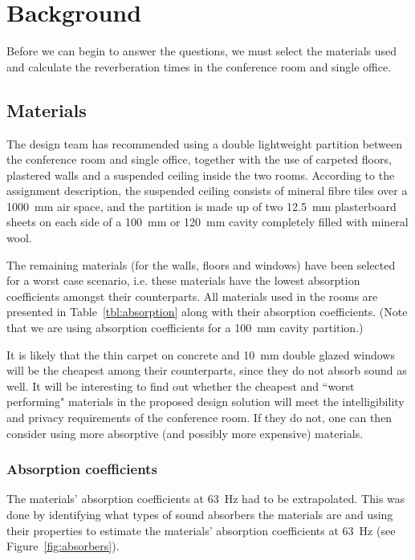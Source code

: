 \section{Background}

Before we can begin to answer the questions, we must select the materials used and calculate the reverberation times in the conference room and single office.



\subsection{Materials}

The design team has recommended using a double lightweight partition between the conference room and single office, together with the use of carpeted floors, plastered walls and a suspended ceiling inside the two rooms.
According to the assignment description, the suspended ceiling consists of mineral fibre tiles over a 1000~mm air space, and the partition is made up of two 12.5~mm plasterboard sheets on each side of a 100~mm or 120~mm cavity completely filled with mineral wool.

The remaining materials (for the walls, floors and windows) have been selected for a worst case scenario, i.e. these materials have the lowest absorption coefficients amongst their counterparts.
All materials used in the rooms are presented in Table~\ref{tbl:absorption} along with their absorption coefficients.
(Note that we are using absorption coefficients for a 100~mm cavity partition.)

It is likely that the thin carpet on concrete and 10~mm double glazed windows will be the cheapest among their counterparts, since they do not absorb sound as well.
It will be interesting to find out whether the cheapest and ``worst performing" materials in the proposed design solution will meet the intelligibility and privacy requirements of the conference room.
If they do not, one can then consider using more absorptive (and possibly more expensive) materials.





\subsubsection{Absorption coefficients}

The materials' absorption coefficients at 63~Hz had to be extrapolated.
This was done by identifying what types of sound absorbers the materials are and using their properties to estimate the materials' absorption coefficients at 63~Hz (see Figure~\ref{fig:absorbers}).

